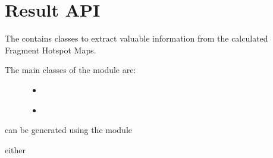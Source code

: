 \documentclass[letterpaper,10pt,english]{sphinxmanual}
\begin{document}
\chapter{Result API}
\label{\detokenize{result_api:module-hotspots.result}}\label{\detokenize{result_api:result-api}}\label{\detokenize{result_api::doc}}
The {\hyperref[\detokenize{result_api:module-hotspots.result}]{}} contains classes to extract valuable information from the calculated Fragment Hotspot Maps.
\begin{description}
\item[{The main classes of the {\hyperref[\detokenize{result_api:module-hotspots.result}]{}} module are:}] \leavevmode\begin{itemize}
\item {} 
{\hyperref[\detokenize{result_api:hotspots.result.Results}]{}}

\item {} 
{\hyperref[\detokenize{result_api:hotspots.result.Extractor}]{}}

\end{itemize}

\end{description}

{\hyperref[\detokenize{result_api:hotspots.result.Results}]{}} can be generated using the {\hyperref[\detokenize{calculation_api:module-hotspots.calculation}]{}} module

\begin{sphinxVerbatim}[commandchars=\\\{\}]
   
  
\end{sphinxVerbatim}

either

\begin{sphinxVerbatim}[commandchars=\\\{\}]
\end{sphinxVerbatim}
\end{document}
